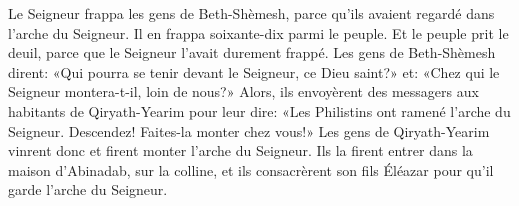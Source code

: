 Le Seigneur frappa les gens de Beth-Shèmesh,
	parce qu’ils avaient regardé dans l’arche du Seigneur.
Il en frappa soixante-dix parmi le peuple.
	Et le peuple prit le deuil, parce que le Seigneur l’avait durement frappé.
Les gens de Beth-Shèmesh dirent:
	«Qui pourra se tenir devant le Seigneur, ce Dieu saint?»
	et: «Chez qui le Seigneur montera-t-il, loin de nous?»
Alors, ils envoyèrent des messagers aux habitants de Qiryath-Yearim pour leur dire:
	«Les Philistins ont ramené l’arche du Seigneur.
	Descendez! Faites-la monter chez vous!»
Les gens de Qiryath-Yearim vinrent donc et firent monter l’arche du Seigneur.
Ils la firent entrer dans la maison d’Abinadab, sur la colline,
	et ils consacrèrent son fils Éléazar pour qu’il garde l’arche du Seigneur.
